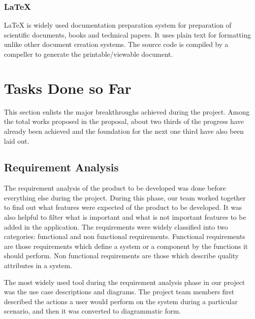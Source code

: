 \documentclass[12pt, a4paper, oneside]{article}
\begin{document}
\subsubsection{LaTeX}
LaTeX is widely used documentation preparation system for preparation of scientific documents, books and technical papers. It uses plain text for formatting unlike other document creation systems. The source code is compiled by a compeller to generate the printable/viewable document.

\pagebreak
\section{Tasks Done so Far}
This section enlists the major breakthroughs achieved during the project. Among the total works proposed in the proposal, about two thirds of the progress have already been achieved and the foundation for the next one third have also been laid out.

\subsection{Requirement Analysis}
The requirement analysis of the product to be developed was done before everything else during the project. During this phase, our team worked together to find out what features were expected of the product to be developed. It was also helpful to filter what is important and what is not important features to be added in the application. The requirements were widely classified into two categories: functional and non functional requirements. Functional requirements are those requirements which define a system or a component by the functions it should perform. Non functional requirements are those which describe quality attributes in a system.

The most widely used tool during the requirement analysis phase in our project was the use case descriptions and diagrams. The project team members first described the actions a user would perform on the system during a particular scenario, and then it was converted to diagrammatic form. 
\end{document}
